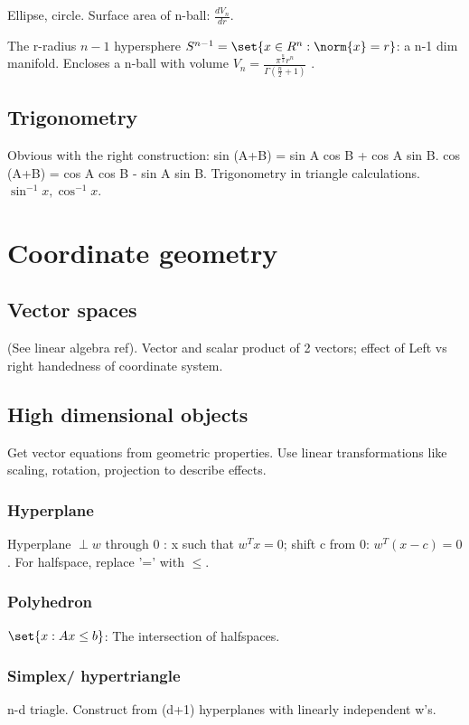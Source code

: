 \documentclass[oneside, article]{memoir}
\begin{document}
Ellipse, circle. Surface area of n-ball: $\frac{dV_{n}}{dr}$.

The r-radius $n-1$ hypersphere $S^{n-1} = \set{x \in R^{n}: \norm{x} = r}$: a n-1 dim manifold. Encloses a n-ball with volume $V_{n} = \frac{\pi^{\frac{n}{2}}r^{n}}{\Gamma(\frac{n}{2}+1)}$ \why.

\section{Trigonometry}
Obvious with the right construction: sin (A+B) = sin A cos B + cos A sin B. cos (A+B) = cos A cos B - sin A sin B. Trigonometry in triangle calculations. $\sin^{-1} x, \cos^{-1} x$.

\chapter{Coordinate geometry}
\section{Vector spaces}
(See linear algebra ref). Vector and scalar product of 2 vectors; effect of Left vs right handedness of coordinate system.

\section{High dimensional objects}
Get vector equations from geometric properties. Use linear transformations like scaling, rotation, projection to describe effects.

\subsection{Hyperplane}
Hyperplane $\perp w$ through 0 : x such that $w^{T}x = 0$; shift c from 0: $w^{T}(x-c) = 0$. For halfspace, replace '=' with $\leq$.

\subsection{Polyhedron}
$\set{x: Ax \leq b}$: The intersection of halfspaces.

\subsection{Simplex/ hypertriangle}
n-d triagle. Construct from (d+1) hyperplanes with linearly independent w's.
\end{document}
